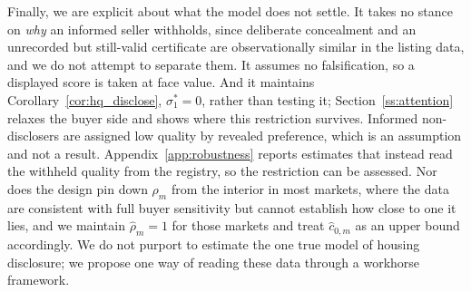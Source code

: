 Finally, we are explicit about what the model does not settle. It takes no stance on
\emph{why} an informed seller withholds, since deliberate concealment and an unrecorded but
still-valid certificate are observationally similar in the listing data, and we do not
attempt to separate them. It assumes no falsification, so a displayed score is taken at face
value. And it maintains Corollary~\ref{cor:hq_disclose}, $\sigma_1^*=0$, rather than testing
it; Section~\ref{ss:attention} relaxes the buyer side and shows where this restriction survives. Informed non-disclosers are assigned low quality by revealed preference, which is an
assumption and not a result. Appendix~\ref{app:robustness} reports estimates that instead read
the withheld quality from the registry, so the restriction can be assessed. Nor does the
design pin down $\rho_m$ from the interior in most markets, where the data are consistent with full
buyer sensitivity but cannot establish how close to one it lies, and we maintain
$\hat\rho_m = 1$ for those markets and treat $\hat c_{0,m}$ as an upper bound accordingly. We
do not purport to estimate the one true model of housing disclosure; we propose one way of
reading these data through a workhorse framework.
